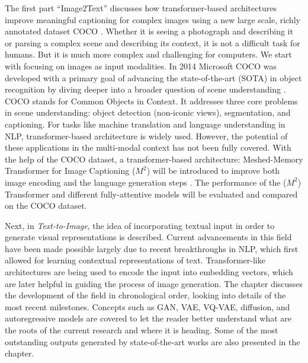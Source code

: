 \documentclass[
]{krantz}
\begin{document}
The first part ``Image2Text'' discusses how transformer-based architectures improve meaningful captioning for complex images using a new large scale, richly annotated dataset COCO \citep{mccoco, cornia2020m2}.
Whether it is seeing a photograph and describing it or parsing a complex scene and describing its context, it is not a difficult task for humans.
But it is much more complex and challenging for computers.
We start with focusing on images as input modalities.
In 2014 Microsoft COCO was developed with a primary goal of advancing the state-of-the-art (SOTA) in object recognition by diving deeper into a broader question of scene understanding \citep{mccoco}.
COCO stands for Common Objects in Context.
It addresses three core problems in scene understanding: object detection (non-iconic views), segmentation, and captioning.
For tasks like machine translation and language understanding in NLP, transformer-based architecture is widely used.
However, the potential of these applications in the multi-modal context has not been fully covered.
With the help of the COCO dataset, a transformer-based architecture: Meshed-Memory Transformer for Image Captioning (\(M^2\)) will be introduced to improve both image encoding and the language generation steps \citep{cornia2020m2}.
The performance of the (\(M^2\)) Transformer and different fully-attentive models will be evaluated and compared on the COCO dataset.

Next, in \emph{Text-to-Image}, the idea of incorporating textual input in order to generate visual representations is described. Current advancements in this field have been made possible largely due to recent breakthroughs in NLP, which first allowed for learning contextual representations of text. Transformer-like architectures are being used to encode the input into embedding vectors, which are later helpful in guiding the process of image generation. The chapter discusses the development of the field in chronological order, looking into details of the most recent milestones. Concepts such as GAN, VAE, VQ-VAE, diffusion, and autoregressive models are covered to let the reader better understand what are the roots of the current research and where it is heading. Some of the most outstanding outputs generated by state-of-the-art works are also presented in the chapter.
\end{document}
